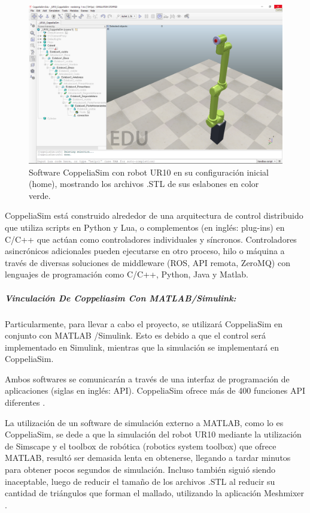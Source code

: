 \documentclass{article}
\begin{document}
\begin{sloppypar}
\begin{figure}[H]
    \centering
    \includegraphics[width=1\textwidth] {Software CoppeliaSim}
    \caption{Software CoppeliaSim con robot UR10 en su configuración inicial (home), mostrando los archivos .STL de sus eslabones en color verde.}
    \label{fig:Software CoppeliaSim}
\end{figure}

CoppeliaSim está construido alrededor de una arquitectura de control distribuido que utiliza scripts en Python y Lua, o complementos (en inglés: plug-ins) en C/C++ que actúan como controladores individuales y síncronos. Controladores asincrónicos adicionales pueden ejecutarse en otro proceso, hilo o máquina a través de diversas soluciones de middleware (ROS, API remota, ZeroMQ) con lenguajes de programación como C/C++, Python, Java y Matlab.


\subparagraph{Vinculación De Coppeliasim Con MATLAB/Simulink:}
\label{sec:Vinculación De Coppeliasim Con MATLAB/Simulink:}
\hfill

Particularmente, para llevar a cabo el proyecto, se utilizará CoppeliaSim en conjunto con MATLAB /Simulink. Esto es debido a que el control será implementado en Simulink, mientras que la simulación se implementará en CoppeliaSim.

Ambos softwares se comunicarán a través de una interfaz de programación de aplicaciones (siglas en inglés: API). CoppeliaSim ofrece más de 400 funciones API diferentes \cite{CoppeliaSim_API_Functions}.

La utilización de un software de simulación externo a MATLAB, como lo es CoppeliaSim, se dede a que la simulación del robot UR10 mediante la utilización de Simscape y el toolbox de robótica (robotics system toolbox) que ofrece MATLAB, resultó ser demasida lenta en obtenerse, llegando a tardar minutos para obtener pocos segundos de simulación. Incluso también siguió siendo inaceptable, luego de reducir el tamaño de los archivos .STL al reducir su cantidad de triángulos que forman el mallado, utilizando la aplicación Meshmixer \cite{Meshmixer}.


\end{sloppypar}
\end{document}
